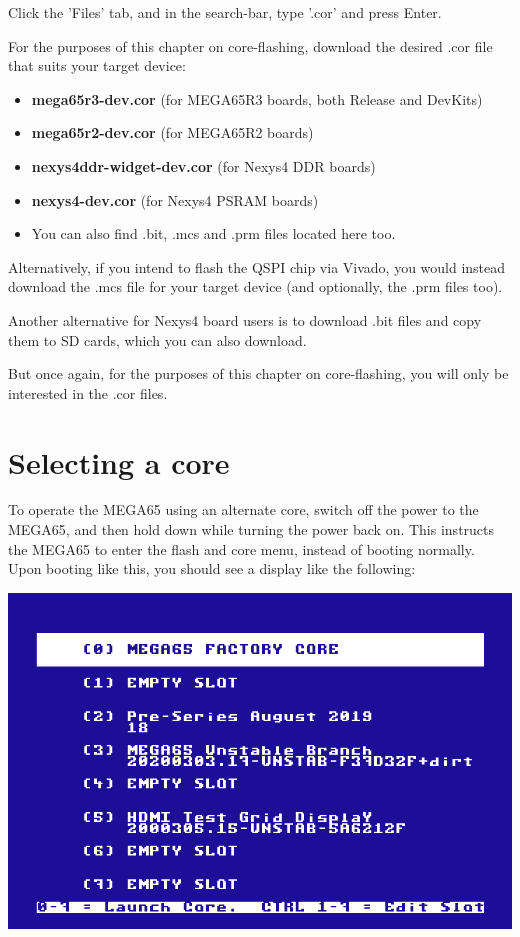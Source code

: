 Click the 'Files' tab, and in the search-bar, type '.cor' and press Enter.

For the purposes of this chapter on core-flashing, download the desired .cor file that suits your target device:

\begin{itemize}
  \item{\textbf{mega65r3-dev.cor} (for MEGA65R3 boards, both Release and DevKits)}
  \item{\textbf{mega65r2-dev.cor} (for MEGA65R2 boards)}
  \item{\textbf{nexys4ddr-widget-dev.cor} (for Nexys4 DDR boards)}
  \item{\textbf{nexys4-dev.cor} (for Nexys4 PSRAM boards)}
  \item{You can also find .bit, .mcs and .prm files located here too.}
\end{itemize}

Alternatively, if you intend to flash the QSPI chip via Vivado, you would instead download the .mcs file for your target device (and optionally, the .prm files too).

Another alternative for Nexys4 board users is to download .bit files and copy them to SD cards, which you can also download.

But once again, for the purposes of this chapter on core-flashing, you will only be interested in the .cor files.

\section{Selecting a core}

To operate the MEGA65 using an alternate core, switch off the power to the MEGA65, and then hold
 down while turning the power back on.  This instructs the MEGA65 to enter the
flash and core menu, instead of booting normally. Upon booting like this, you should see a display like the following:

\includegraphics[width=\linewidth]{images/ss-flashmenu.png}

